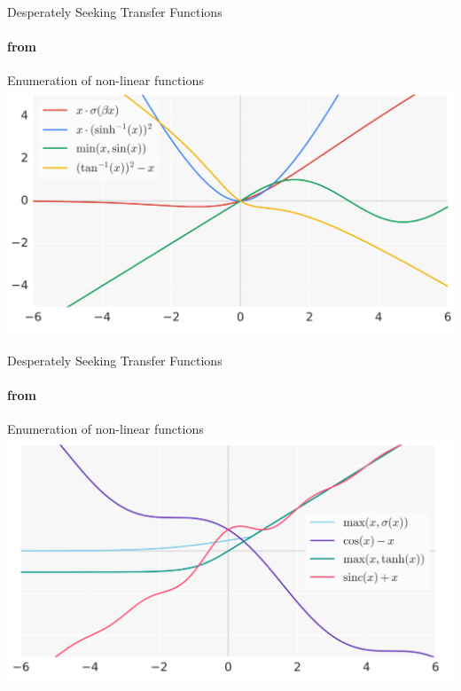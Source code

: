 \begin{frame}{Desperately Seeking Transfer Functions}
\framesubtitle{from \cite{Ramachandran2017}}
\begin{block}{Enumeration of non-linear functions}
\centering
\includegraphics[scale=0.5]{figures/ff/novelfunctions1.png}
\end{block}
\end{frame}

\begin{frame}{Desperately Seeking Transfer Functions}
\framesubtitle{from \cite{Ramachandran2017}}
\begin{block}{Enumeration of non-linear functions}
\centering
\includegraphics[scale=0.5]{figures/ff/novelfunctions2.png}
\end{block}
\end{frame}

